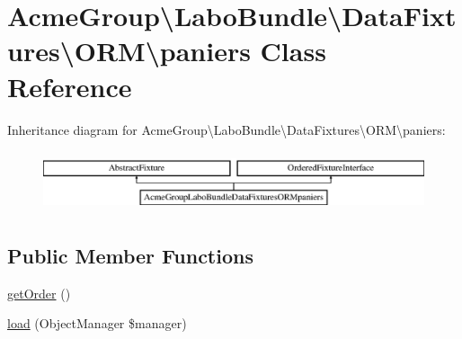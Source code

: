 \hypertarget{class_acme_group_1_1_labo_bundle_1_1_data_fixtures_1_1_o_r_m_1_1paniers}{\section{Acme\+Group\textbackslash{}Labo\+Bundle\textbackslash{}Data\+Fixtures\textbackslash{}O\+R\+M\textbackslash{}paniers Class Reference}
\label{class_acme_group_1_1_labo_bundle_1_1_data_fixtures_1_1_o_r_m_1_1paniers}
}
Inheritance diagram for Acme\+Group\textbackslash{}Labo\+Bundle\textbackslash{}Data\+Fixtures\textbackslash{}O\+R\+M\textbackslash{}paniers\+:\begin{figure}[H]
\begin{center}
\leavevmode
\includegraphics[height=1.794872cm]{class_acme_group_1_1_labo_bundle_1_1_data_fixtures_1_1_o_r_m_1_1paniers}
\end{center}
\end{figure}
\subsection*{Public Member Functions}
\begin{DoxyCompactItemize}
\item 
\hyperlink{class_acme_group_1_1_labo_bundle_1_1_data_fixtures_1_1_o_r_m_1_1paniers_a6ce4e34d899bcfaf1425e639c87d9a30}{get\+Order} ()
\item 
\hyperlink{class_acme_group_1_1_labo_bundle_1_1_data_fixtures_1_1_o_r_m_1_1paniers_ade45cf63ef17582e53693bd6ae5b8199}{load} (Object\+Manager \$manager)
\end{DoxyCompactItemize}


